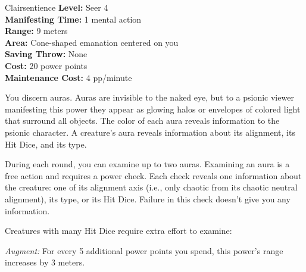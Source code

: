{Clairsentience}
{
	\textbf{Level:}
	Seer 4\\
	\textbf{Manifesting Time:}
	1 mental action\\
	\textbf{Range:}
	9 meters\\
	\textbf{Area:}
	Cone-shaped emanation centered on you\\
	\textbf{Saving Throw:}
	None\\
	\textbf{Cost:}
	20 power points\\
	\textbf{Maintenance Cost:}
	4 pp/minute\\
}
{
	You discern auras. Auras are invisible to the naked eye, but to a psionic viewer manifesting this power they appear as glowing halos or envelopes of colored light that surround all objects. The color of each aura reveals information to the psionic character. A creature's aura reveals information about its alignment, its Hit Dice, and its type.

	During each round, you can examine up to two auras. Examining an aura is a free action and requires a power check. Each check reveals one information about the creature: one of its alignment axis (i.e., only chaotic from its chaotic neutral alignment), its type, or its Hit Dice. Failure in this check doesn't give you any information.

	Creatures with many Hit Dice require extra effort to examine:


	\textit{Augment:} For every 5 additional power points you spend, this power's range increases by 3 meters.
}
